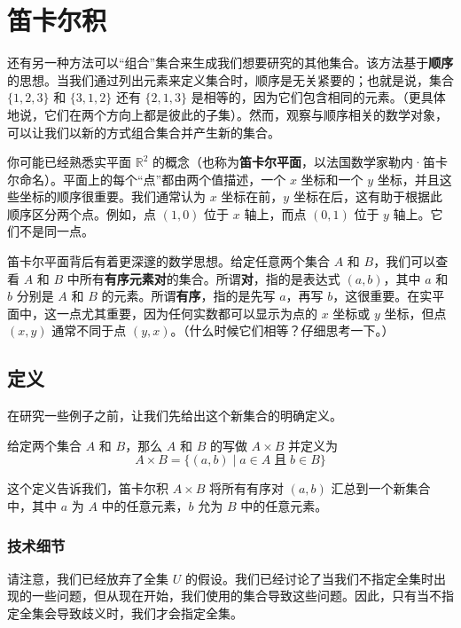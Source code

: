\section{笛卡尔积}

还有另一种方法可以``组合''集合来生成我们想要研究的其他集合。该方法基于\textbf{顺序}的思想。当我们通过列出元素来定义集合时，顺序是无关紧要的；也就是说，集合 $\{1, 2, 3\}$ 和 $\{3, 1, 2\}$ 还有 $\{2, 1, 3\}$ 是相等的，因为它们包含相同的元素。（更具体地说，它们在两个方向上都是彼此的子集）。然而，观察与顺序相关的数学对象，可以让我们以新的方式组合集合并产生新的集合。

你可能已经熟悉实平面 $\mathbb{R}^2$ 的概念（也称为\textbf{笛卡尔平面}，以法国数学家勒内·笛卡尔命名）。平面上的每个``点''都由两个值描述，一个 $x$ 坐标和一个 $y$ 坐标，并且这些坐标的顺序很重要。我们通常认为 $x$ 坐标在前，$y$ 坐标在后，这有助于根据此顺序区分两个点。例如，点 $(1, 0)$ 位于 $x$ 轴上，而点 $(0, 1)$ 位于 $y$ 轴上。它们不是同一点。

笛卡尔平面背后有着更深邃的数学思想。给定任意两个集合 $A$ 和 $B$，我们可以查看 $A$ 和 $B$ 中所有\textbf{有序元素对}的集合。所谓\textbf{对}，指的是表达式 $(a, b)$，其中 $a$ 和 $b$ 分别是 $A$ 和 $B$ 的元素。所谓\textbf{有序}，指的是先写 $a$，再写 $b$，这很重要。在实平面中，这一点尤其重要，因为任何实数都可以显示为点的 $x$ 坐标或 $y$ 坐标，但点 $(x, y)$ 通常不同于点 $(y, x)$。（什么时候它们相等？仔细思考一下。）

\subsection{定义}

在研究一些例子之前，让我们先给出这个新集合的明确定义。

\begin{definition}
    给定两个集合 $A$ 和 $B$，那么 $A$ 和 $B$ 的写做 $A \times B$ 并定义为
    \[A \times B = \{(a, b) \mid a \in A \;\text{且}\; b \in B\}\]
\end{definition}

这个定义告诉我们，笛卡尔积 $A \times B$ 将所有有序对 $(a, b)$ 汇总到一个新集合中，其中 $a$ 为 $A$ 中的任意元素，$b$ 允为 $B$ 中的任意元素。

\subsubsection*{技术细节}

请注意，我们已经放弃了全集 $U$ 的假设。我们已经讨论了当我们不指定全集时出现的一些问题，但从现在开始，我们使用的集合导致这些问题。因此，只有当不指定全集会导致歧义时，我们才会指定全集。

